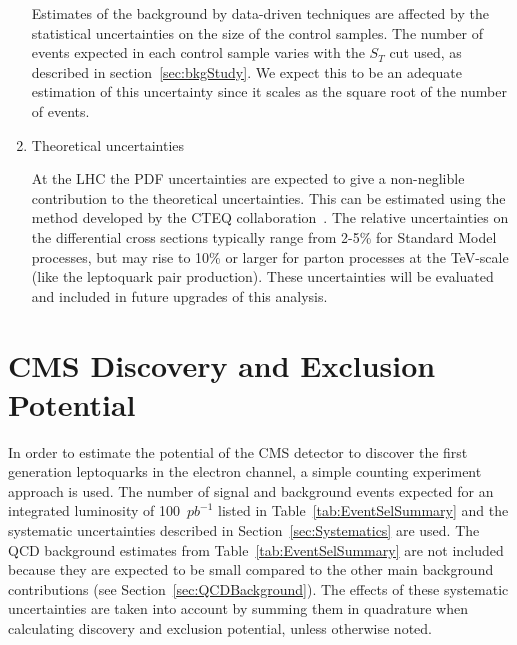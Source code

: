 \documentclass{cmspaper}
\begin{document}
\begin{linenumbers}
\begin{enumerate}
Estimates of the background by data-driven techniques are affected by the statistical
uncertainties on the size of the control samples.
The number of events expected in each control sample varies with the $S_T$ cut used, as 
described in section~\ref{sec:bkgStudy}. 
We expect this to be an adequate estimation of this
uncertainty since it scales as the square root of the number of events.
%
\item Theoretical uncertainties 

At the LHC the PDF uncertainties are expected to give a non-neglible
contribution to the theoretical uncertainties.  This can be estimated 
using the method developed by the CTEQ collaboration~\cite{CTEQreweighting}.
The relative uncertainties on the differential cross sections 
typically range from 2-5\% for Standard Model processes, 
but may rise to 10\% or larger for parton processes at the TeV-scale 
(like the leptoquark pair production).
These uncertainties will be evaluated and included in future upgrades of this analysis.
\end{enumerate}



\section{CMS Discovery and Exclusion Potential} \label{CMSpotential}

In order to estimate the potential of the CMS detector to discover the first generation leptoquarks
in the electron channel, a simple counting experiment approach is used. 
The number of signal and background events expected for an integrated luminosity of
100~$pb^{-1}$ listed in Table~\ref{tab:EventSelSummary} and the systematic uncertainties described 
in Section~\ref{sec:Systematics} are used. 
The QCD background estimates from Table~\ref{tab:EventSelSummary} 
are not included because they are expected to be 
small compared to the other main background contributions (see Section~\ref{sec:QCDBackground}).
The effects of these systematic uncertainties are taken into account
by summing them in quadrature when calculating discovery and exclusion potential, unless otherwise noted.



\end{linenumbers}
\end{document}
